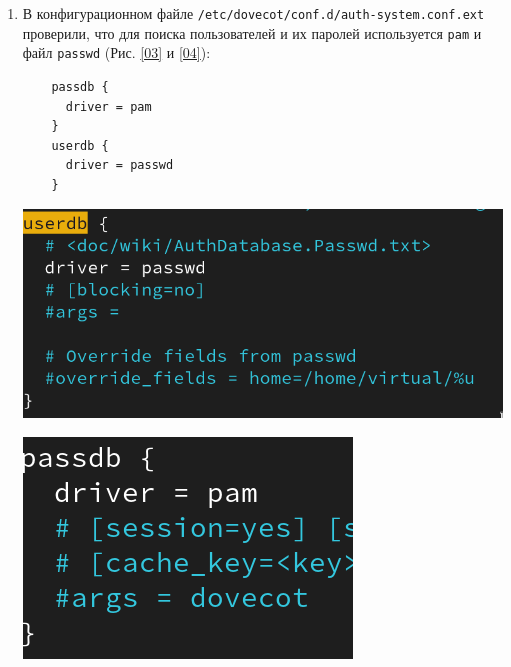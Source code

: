 \begin{enumerate}
\item В конфигурационном файле 
\texttt{/etc/dovecot/conf.d/auth-system.conf.ext} проверили, что для поиска пользователей и их паролей используется \texttt{pam} и файл \texttt{passwd} (Рис. \ref{03} и \ref{04}):
  \begin{verbatim}
    passdb {
      driver = pam
    }
    userdb {
      driver = passwd
    }
  \end{verbatim}
\begin{center}
    \centering
    \includegraphics[width=\textwidth]{../images/image03.png}
    \label{03}
\end{center}
\begin{center}
    \centering
    \includegraphics[width=\textwidth]{../images/image04.png}
    \label{04}
\end{center}


\end{enumerate}
